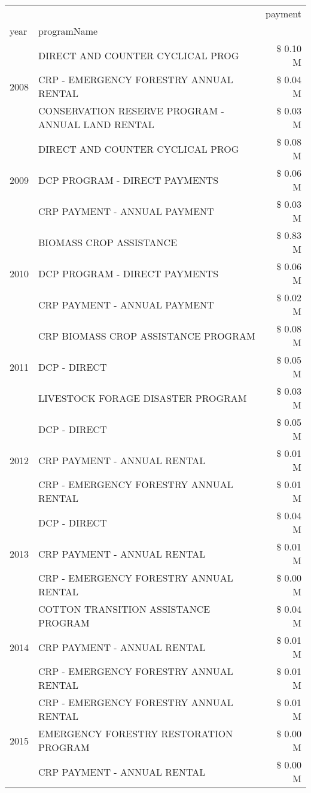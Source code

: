 \begin{tabular}{llr}
\toprule
 &  & payment \\
year & programName &  \\
\midrule
\multirow[t]{3}{*}{2008} & DIRECT AND COUNTER CYCLICAL PROG & \$ 0.10 M \\
 & CRP - EMERGENCY FORESTRY ANNUAL RENTAL & \$ 0.04 M \\
 & CONSERVATION RESERVE PROGRAM - ANNUAL LAND RENTAL & \$ 0.03 M \\
\cline{1-3}
\multirow[t]{3}{*}{2009} & DIRECT AND COUNTER CYCLICAL PROG & \$ 0.08 M \\
 & DCP PROGRAM - DIRECT PAYMENTS & \$ 0.06 M \\
 & CRP PAYMENT - ANNUAL PAYMENT & \$ 0.03 M \\
\cline{1-3}
\multirow[t]{3}{*}{2010} & BIOMASS CROP ASSISTANCE & \$ 0.83 M \\
 & DCP PROGRAM - DIRECT PAYMENTS & \$ 0.06 M \\
 & CRP PAYMENT - ANNUAL PAYMENT & \$ 0.02 M \\
\cline{1-3}
\multirow[t]{3}{*}{2011} & CRP BIOMASS CROP ASSISTANCE PROGRAM & \$ 0.08 M \\
 & DCP - DIRECT & \$ 0.05 M \\
 & LIVESTOCK FORAGE DISASTER PROGRAM & \$ 0.03 M \\
\cline{1-3}
\multirow[t]{3}{*}{2012} & DCP - DIRECT & \$ 0.05 M \\
 & CRP PAYMENT - ANNUAL RENTAL & \$ 0.01 M \\
 & CRP - EMERGENCY FORESTRY ANNUAL RENTAL & \$ 0.01 M \\
\cline{1-3}
\multirow[t]{3}{*}{2013} & DCP - DIRECT & \$ 0.04 M \\
 & CRP PAYMENT - ANNUAL RENTAL & \$ 0.01 M \\
 & CRP - EMERGENCY FORESTRY ANNUAL RENTAL & \$ 0.00 M \\
\cline{1-3}
\multirow[t]{3}{*}{2014} & COTTON TRANSITION ASSISTANCE PROGRAM & \$ 0.04 M \\
 & CRP PAYMENT - ANNUAL RENTAL & \$ 0.01 M \\
 & CRP - EMERGENCY FORESTRY ANNUAL RENTAL & \$ 0.01 M \\
\cline{1-3}
\multirow[t]{3}{*}{2015} & CRP - EMERGENCY FORESTRY ANNUAL RENTAL & \$ 0.01 M \\
 & EMERGENCY FORESTRY RESTORATION PROGRAM & \$ 0.00 M \\
 & CRP PAYMENT - ANNUAL RENTAL & \$ 0.00 M \\

\end{tabular}
